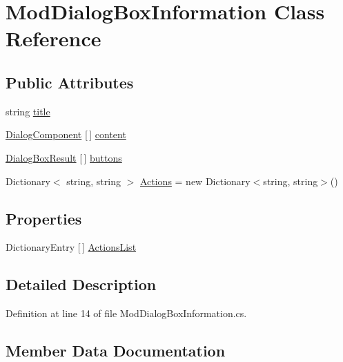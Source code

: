 \hypertarget{class_mod_dialog_box_information}{}\section{Mod\+Dialog\+Box\+Information Class Reference}
\label{class_mod_dialog_box_information}
\subsection*{Public Attributes}
\begin{DoxyCompactItemize}
\item 
string \hyperlink{class_mod_dialog_box_information_a198407cb46aacda4109948aa548ac6a3}{title}
\item 
\hyperlink{class_dialog_component}{Dialog\+Component} \mbox{[}$\,$\mbox{]} \hyperlink{class_mod_dialog_box_information_a02d949373a3b62873905620ad6471cca}{content}
\item 
\hyperlink{_dialog_box_result_8cs_acd933b66f7b1c8ad36ee61780622c54f}{Dialog\+Box\+Result} \mbox{[}$\,$\mbox{]} \hyperlink{class_mod_dialog_box_information_a328073c14bef16ebffc496823d81458f}{buttons}
\item 
Dictionary$<$ string, string $>$ \hyperlink{class_mod_dialog_box_information_ac7ddc975c76019b8861fd55837eb485a}{Actions} = new Dictionary$<$string, string$>$()
\end{DoxyCompactItemize}
\subsection*{Properties}
\begin{DoxyCompactItemize}
\item 
Dictionary\+Entry \mbox{[}$\,$\mbox{]} \hyperlink{class_mod_dialog_box_information_a31815f22f389c7df1f9f2a2e15999e18}{Actions\+List}
\end{DoxyCompactItemize}


\subsection{Detailed Description}


Definition at line 14 of file Mod\+Dialog\+Box\+Information.\+cs.



\subsection{Member Data Documentation}
\mbox{\label{class_mod_dialog_box_information_ac7ddc975c76019b8861fd55837eb485a}} 

